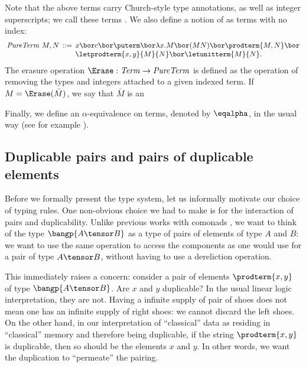\documentclass{llncs}
\begin{document}
Note that the above terms carry Church-style type annotations, as well as integer superscripts; we call these terms . We also define a notion
of  as terms with no index:
\[
\setlength{\arraycolsep}{0.5ex}
\begin{array}{lcl}
  {\it PureTerm}\ M,N&::=& x\bor c\bor \puterm \bor
      \lambda x.M \bor (MN) \bor \prodterm{M,N} \bor\\
      && \letprodterm{x,y}{M}{N}\bor \letunitterm{M}{N}.
\end{array}
\]
The erasure operation $\Erase:{\it Term}\to{\it PureTerm}$ is defined
as the operation of removing the types and integers attached to a
given indexed term.
If $M=\Erase(\bar{M})$, we say that $\bar{M}$ is an 

Finally, we define an $\alpha$-equivalence on terms, denoted by
$\eqalpha$, in the usual way (see for 
example \cite{barendregt84lambda}).


\subsection{Duplicable pairs and pairs of duplicable elements}

Before we formally present the type system, let us informally motivate
our choice of typing rules. One non-obvious choice we had to make is
for the interaction of pairs and duplicability.  Unlike previous works
with comonads \cite{bierman93intuitionistic,benton93term}, we want to
think of the type $\bangp{A\tensor B}$ as a type of pairs of elements
of type $A$ and $B$: we want to use the same operation to access the
components as one would use for a pair of type $A\tensor B$, without
having to use a dereliction operation.

This immediately raises a concern: consider a pair of elements
$\prodterm{x,y}$ of type $\bangp{A\tensor B}$. Are $x$ and $y$
duplicable? In the usual linear logic interpretation, they are not. Having a infinite supply of pair of shoes does not mean
one has an infinite supply of right shoes: we cannot discard the left
shoes. On the other hand, in our interpretation of ``classical'' data as residing in ``classical'' memory and therefore being duplicable, if the string
$\prodterm{x,y}$ is duplicable, then so should be the elements $x$ and $y$.
In other words, we want the duplication to ``permeate'' the pairing.
\end{document}
